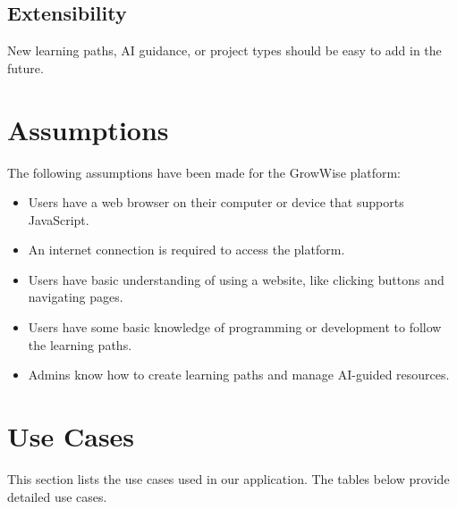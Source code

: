 \documentclass{FastFyp}
\begin{document}
\subsection{Extensibility}
New learning paths, AI guidance, or project types should be easy to add in the future.

\section{Assumptions}

The following assumptions have been made for the GrowWise platform:

\begin{itemize}
    \item Users have a web browser on their computer or device that supports JavaScript.
    \item An internet connection is required to access the platform.
    \item Users have basic understanding of using a website, like clicking buttons and navigating pages.
    \item Users have some basic knowledge of programming or development to follow the learning paths.
    \item Admins know how to create learning paths and manage AI-guided resources.
\end{itemize}

\section{Use Cases}
This section lists the use cases used in our application.
The tables below provide detailed use cases.

\end{document}
